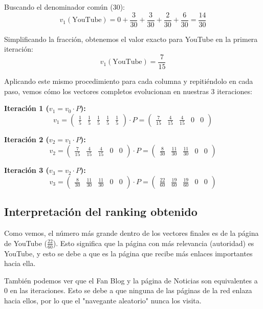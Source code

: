 Buscando el denominador común (30):
\begin{equation}
    v_1(\text{YouTube}) = 0 + \frac{3}{30} + \frac{3}{30} + \frac{2}{30} + \frac{6}{30} = \frac{14}{30}
\end{equation}

Simplificando la fracción, obtenemos el valor exacto para YouTube en la primera iteración:
\begin{equation}
    v_1(\text{YouTube}) = \frac{7}{15}
\end{equation}

Aplicando este mismo procedimiento para cada columna y repitiéndolo en cada paso, vemos cómo los vectores completos evolucionan en nuestras 3 iteraciones:

\textbf{Iteración 1 ($v_1 = v_0 \cdot P$):}
\begin{equation*}
    v_1 = \begin{pmatrix} \frac{1}{5} & \frac{1}{5} & \frac{1}{5} & \frac{1}{5} & \frac{1}{5} \end{pmatrix} \cdot P = \begin{pmatrix} \frac{7}{15} & \frac{4}{15} & \frac{4}{15} & 0 & 0 \end{pmatrix}
\end{equation*}

\textbf{Iteración 2 ($v_2 = v_1 \cdot P$):}
\begin{equation*}
    v_2 = \begin{pmatrix} \frac{7}{15} & \frac{4}{15} & \frac{4}{15} & 0 & 0 \end{pmatrix} \cdot P = \begin{pmatrix} \frac{8}{30} & \frac{11}{30} & \frac{11}{30} & 0 & 0 \end{pmatrix}
\end{equation*}

\textbf{Iteración 3 ($v_3 = v_2 \cdot P$):}
\begin{equation*}
    v_3 = \begin{pmatrix} \frac{8}{30} & \frac{11}{30} & \frac{11}{30} & 0 & 0 \end{pmatrix} \cdot P = \begin{pmatrix} \frac{22}{60} & \frac{19}{60} & \frac{19}{60} & 0 & 0 \end{pmatrix}
\end{equation*}

\subsection{Interpretación del ranking obtenido}
Como vemos, el número más grande dentro de los vectores finales es de la página de YouTube ($\frac{22}{60}$). Esto significa que la página con más relevancia (autoridad) es YouTube, y esto se debe a que es la página que recibe más enlaces importantes hacia ella.

También podemos ver que el Fan Blog y la página de Noticias son equivalentes a 0 en las iteraciones. Esto se debe a que ninguna de las páginas de la red enlaza hacia ellos, por lo que el "navegante aleatorio" nunca los visita.

